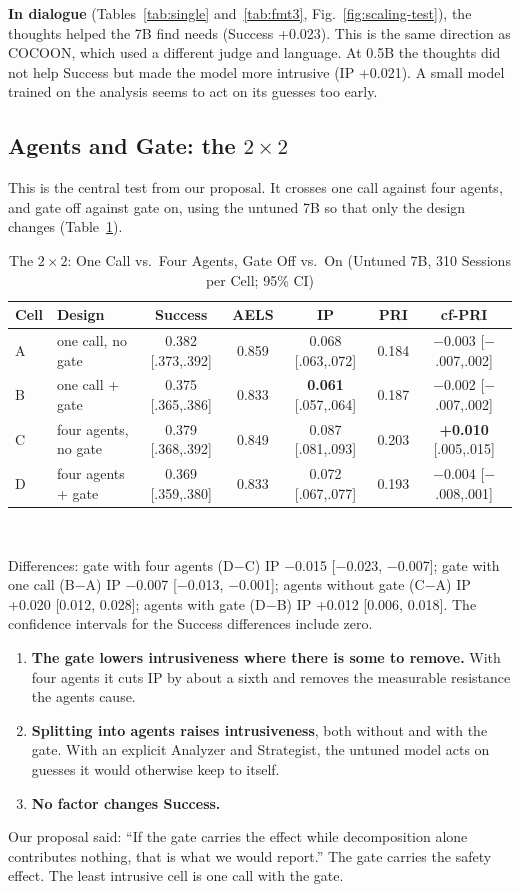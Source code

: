 \documentclass[journal]{IEEEtran}
\newcommand{\tsize}{\footnotesize}
\begin{document}
\textbf{In dialogue} (Tables~\ref{tab:single} and~\ref{tab:fmt3}, Fig.~\ref{fig:scaling-test}), the thoughts helped the 7B find needs (Success +0.023). This is the same direction as COCOON, which used a different judge and language. At 0.5B the thoughts did not help Success but made the model more intrusive (IP +0.021). A small model trained on the analysis seems to act on its guesses too early.

\subsection{Agents and Gate: the \texorpdfstring{$2\times2$}{2x2}}\label{sec:a-2x2}
This is the central test from our proposal. It crosses one call against four agents, and gate off against gate on, using the untuned 7B so that only the design changes (Table~\ref{tab:2x2}).

\begin{table}[!t]
\caption{The $2\times2$: One Call vs.\ Four Agents, Gate Off vs.\ On (Untuned 7B, 310 Sessions per Cell; 95\% CI)}
\label{tab:2x2}
\centering\tsize
\begin{tabular}{@{}llccccc@{}}
\toprule
Cell & Design & Success & AELS & IP & PRI & cf-PRI\\
\midrule
A & one call, no gate & 0.382 [.373,.392] & 0.859 & 0.068 [.063,.072] & 0.184 & $-$0.003 [$-$.007,.002]\\
B & one call + gate & 0.375 [.365,.386] & 0.833 & \textbf{0.061} [.057,.064] & 0.187 & $-$0.002 [$-$.007,.002]\\
C & four agents, no gate & 0.379 [.368,.392] & 0.849 & 0.087 [.081,.093] & 0.203 & \textbf{+0.010} [.005,.015]\\
D & four agents + gate & 0.369 [.359,.380] & 0.833 & 0.072 [.067,.077] & 0.193 & $-$0.004 [$-$.008,.001]\\
\bottomrule
\end{tabular}\\[3pt]
\parbox{\textwidth}{\scriptsize Differences: gate with four agents (D$-$C) IP $-$0.015 [$-$0.023, $-$0.007]; gate with one call (B$-$A) IP $-$0.007 [$-$0.013, $-$0.001]; agents without gate (C$-$A) IP +0.020 [0.012, 0.028]; agents with gate (D$-$B) IP +0.012 [0.006, 0.018]. The confidence intervals for the Success differences include zero.}
\end{table}

\begin{enumerate}
\item \textbf{The gate lowers intrusiveness where there is some to remove.} With four agents it cuts IP by about a sixth and removes the measurable resistance the agents cause.
\item \textbf{Splitting into agents raises intrusiveness}, both without and with the gate. With an explicit Analyzer and Strategist, the untuned model acts on guesses it would otherwise keep to itself.
\item \textbf{No factor changes Success.}
\end{enumerate}
Our proposal said: ``If the gate carries the effect while decomposition alone contributes nothing, that is what we would report.'' The gate carries the safety effect. The least intrusive cell is one call with the gate.
\end{document}
